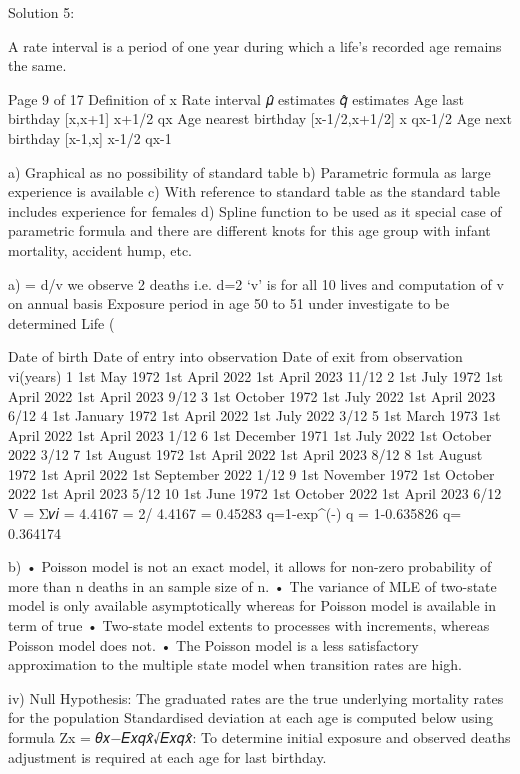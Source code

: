 Solution 5:
\item
A rate interval is a period of one year during which a life’s recorded age remains the same.

Page 9 of 17
Definition of x
Rate interval
𝜇̂ estimates
𝑞̂ estimates
Age last birthday
[x,x+1]
\mu x+1/2
qx
Age nearest birthday
[x-1/2,x+1/2]
\mu x
qx-1/2
Age next birthday
[x-1,x]
\mu x-1/2
qx-1

\item
a) Graphical as no possibility of standard table
b) Parametric formula as large experience is available
c) With reference to standard table as the standard table includes experience for females
d) Spline function to be used as it special case of parametric formula and there are different knots for this age group with infant mortality, accident hump, etc.

\item
a)
\mu  = d/v
we observe 2 deaths i.e. d=2
‘v’ is for all 10 lives and computation of v on annual basis
Exposure period in age 50 to 51 under investigate to be determined
Life (\item
Date of birth
Date of entry into observation
Date of exit from observation
vi(years)
1
1st May 1972
1st April 2022
1st April 2023
11/12
2
1st July 1972
1st April 2022
1st April 2023
9/12
3
1st October 1972
1st July 2022
1st April 2023
6/12
4
1st January 1972
1st April 2022
1st July 2022
3/12
5
1st March 1973
1st April 2022
1st April 2023
1/12
6
1st December 1971
1st July 2022
1st October 2022
3/12
7
1st August 1972
1st April 2022
1st April 2023
8/12
8
1st August 1972
1st April 2022
1st September 2022
1/12
9
1st November 1972
1st October 2022
1st April 2023
5/12
10
1st June 1972
1st October 2022
1st April 2023
6/12
V = Σ𝑣𝑖 = 4.4167
\mu  = 2/ 4.4167 = 0.45283
q=1-exp^(-\mu )
q = 1-0.635826
q= 0.364174

b)
• Poisson model is not an exact model, it allows for non-zero probability of more than n deaths in an sample size of n.
• The variance of MLE of two-state model is only available asymptotically whereas for Poisson model is available in term of true \mu 
• Two-state model extents to processes with increments, whereas Poisson model does not.
• The Poisson model is a less satisfactory approximation to the multiple state model when transition rates are high.

iv)
Null Hypothesis: The graduated rates are the true underlying mortality rates for the population
Standardised deviation at each age is computed below using formula
Zx = 𝜃𝑥−𝐸𝑥𝑞𝑥̂√𝐸𝑥𝑞𝑥̂:
To determine initial exposure and observed deaths adjustment is required at each age for last birthday.

